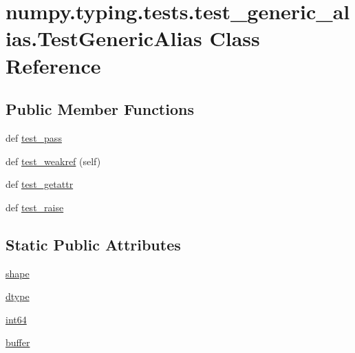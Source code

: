 \hypertarget{classnumpy_1_1typing_1_1tests_1_1test__generic__alias_1_1TestGenericAlias}{}\section{numpy.\+typing.\+tests.\+test\+\_\+generic\+\_\+alias.\+Test\+Generic\+Alias Class Reference}
\label{classnumpy_1_1typing_1_1tests_1_1test__generic__alias_1_1TestGenericAlias}
\subsection*{Public Member Functions}
\begin{DoxyCompactItemize}
\item 
def \hyperlink{classnumpy_1_1typing_1_1tests_1_1test__generic__alias_1_1TestGenericAlias_af8b00feb916efa007cf3fde531feb9f5}{test\+\_\+pass}
\item 
def \hyperlink{classnumpy_1_1typing_1_1tests_1_1test__generic__alias_1_1TestGenericAlias_aaf64123f6e11a7134139a2527f5e7fee}{test\+\_\+weakref} (self)
\item 
def \hyperlink{classnumpy_1_1typing_1_1tests_1_1test__generic__alias_1_1TestGenericAlias_ab00aae5d522a1ec2cc85aedf8548af87}{test\+\_\+getattr}
\item 
def \hyperlink{classnumpy_1_1typing_1_1tests_1_1test__generic__alias_1_1TestGenericAlias_a021449c001a800a2f708e787f700193d}{test\+\_\+raise}
\end{DoxyCompactItemize}
\subsection*{Static Public Attributes}
\begin{DoxyCompactItemize}
\item 
\hyperlink{classnumpy_1_1typing_1_1tests_1_1test__generic__alias_1_1TestGenericAlias_afb92fffc5aff29a3d6b21fabe42386ea}{shape}
\item 
\hyperlink{classnumpy_1_1typing_1_1tests_1_1test__generic__alias_1_1TestGenericAlias_a3712d1dba0567b90d081d35d7311d888}{dtype}
\item 
\hyperlink{classnumpy_1_1typing_1_1tests_1_1test__generic__alias_1_1TestGenericAlias_a3c9672f7dcab7db138acbe725456618a}{int64}
\item 
\hyperlink{classnumpy_1_1typing_1_1tests_1_1test__generic__alias_1_1TestGenericAlias_a5c6043a8c2cc716e2b9ec5d584632edb}{buffer}
\end{DoxyCompactItemize}


